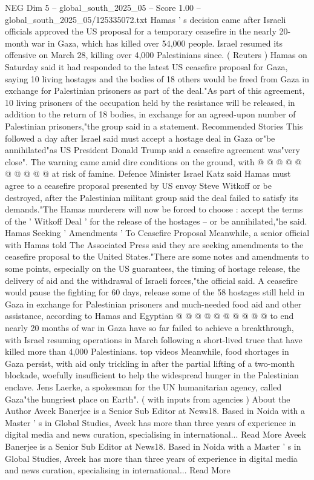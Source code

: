 \begin{textsample}{NEG Dim 5 – global\_south\_2025\_05 – Score 1.00 – global\_south\_2025\_05/125335072.txt}  \label{ex:f5_neg_269}
Hamas ' s decision came after Israeli officials approved the US proposal for a temporary ceasefire in the nearly 20-month war in Gaza, which has killed over 54,000 people.
Israel resumed its offensive on March 28, killing over 4,000 Palestinians since. ( Reuters ) Hamas on Saturday said it had responded to the latest US ceasefire proposal for Gaza, saying 10 living hostages and the bodies of 18 others would be freed from Gaza in exchange for Palestinian prisoners as part of the deal."As part of this agreement, 10 living prisoners of the occupation held by the resistance will be released, in addition to the return of 18 bodies, in exchange for an agreed-upon number of Palestinian prisoners,"the group said in a statement.
Recommended Stories This followed a day after Israel said must accept a hostage deal in Gaza or"be annihilated"as US President Donald Trump said a ceasefire agreement was"very close".
The warning came amid dire conditions on the ground, with @ @ @ @ @ @ @ @ @ @ at risk of famine.
Defence Minister Israel Katz said Hamas must agree to a ceasefire proposal presented by US envoy Steve Witkoff or be destroyed, after the Palestinian militant group said the deal failed to satisfy its demands."The Hamas murderers will now be forced to choose : accept the terms of the ' Witkoff Deal ' for the release of the hostages -- or be annihilated,"he said.
Hamas Seeking ' Amendments ' To Ceasefire Proposal Meanwhile, a senior official with Hamas told The Associated Press said they are seeking amendments to the ceasefire proposal to the United States."There are some notes and amendments to some points, especially on the US guarantees, the timing of hostage release, the delivery of aid and the withdrawal of Israeli forces,"the official said.
A ceasefire would pause the fighting for 60 days, release some of the 58 hostages still held in Gaza in exchange for Palestinian prisoners and much-needed food aid and other assistance, according to Hamas and Egyptian @ @ @ @ @ @ @ @ @ @ to end nearly 20 months of war in Gaza have so far failed to achieve a breakthrough, with Israel resuming operations in March following a short-lived truce that have killed more than 4,000 Palestinians. top videos Meanwhile, food shortages in Gaza persist, with aid only trickling in after the partial lifting of a two-month blockade, woefully insufficient to help the widespread hunger in the Palestinian enclave.
Jens Laerke, a spokesman for the UN humanitarian agency, called Gaza"the hungriest place on Earth". ( with inputs from agencies ) About the Author Aveek Banerjee is a Senior Sub Editor at News18.
Based in Noida with a Master ' s in Global Studies, Aveek has more than three years of experience in digital media and news curation, specialising in international...
Read More Aveek Banerjee is a Senior Sub Editor at News18.
Based in Noida with a Master ' s in Global Studies, Aveek has more than three years of experience in digital media and news curation, specialising in international...
Read More

\end{textsample}

